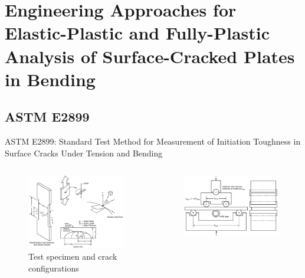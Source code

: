 \section[Engineering Approaches for EP and FP Analysis of Surface Cracks]{Engineering Approaches for Elastic-Plastic and Fully-Plastic Analysis of Surface-Cracked Plates in Bending}

\subsection{ASTM E2899}

\begin{frame}
ASTM E2899: Standard Test Method for Measurement of Initiation Toughness in Surface Cracks Under Tension and Bending
\begin{columns}[b]
\begin{column}{0.45\textwidth}
\begin{figure}
\centering
\includegraphics[width=0.9\columnwidth]{sc-terminology-e2899-modified}
\caption{Test specimen and crack configurations}
\end{figure}
\end{column}
\begin{column}{0.45\textwidth}
\begin{figure}
\centering
\includegraphics[width=0.9\columnwidth]{astm-e2899-4point-bend}

\end{figure}
\end{column}
\end{columns}
\end{frame}
